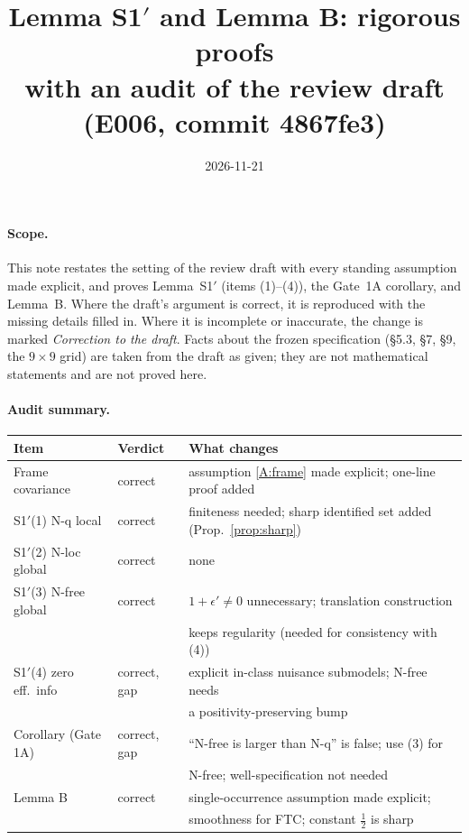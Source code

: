 \documentclass[11pt,a4paper]{article}
\title{Lemma S1$'$ and Lemma B: rigorous proofs\\[2pt]
\large with an audit of the review draft (E006, commit 4867fe3)}
\date{2026-11-21}
\author{}
\theoremstyle{definition}
\theoremstyle{remark}
\newcommand{\eps}{\epsilon}
\begin{document}
\maketitle

\paragraph{Scope.} This note restates the setting of the review draft with every
standing assumption made explicit, and proves Lemma~S1$'$ (items (1)--(4)), the
Gate~1A corollary, and Lemma~B. Where the draft's argument is correct, it is
reproduced with the missing details filled in. Where it is incomplete or
inaccurate, the change is marked \emph{Correction to the draft}. Facts about the
frozen specification (§5.3, §7, §9, the $9\times 9$ grid) are taken from the draft
as given; they are not mathematical statements and are not proved here.

\paragraph{Audit summary.}
\begin{center}
\begin{tabular}{@{}lll@{}}
\toprule
Item & Verdict & What changes \\
\midrule
Frame covariance & correct & assumption \ref{A:frame} made explicit; one-line proof added\\
S1$'$(1) N-q local & correct & finiteness needed; sharp identified set added (Prop.~\ref{prop:sharp})\\
S1$'$(2) N-loc global & correct & none\\
S1$'$(3) N-free global & correct & $1+\eps'\neq 0$ unnecessary; translation construction\\
& & keeps regularity (needed for consistency with (4))\\
S1$'$(4) zero eff.\ info & correct, gap & explicit in-class nuisance submodels; N-free needs\\
& & a positivity-preserving bump\\
Corollary (Gate 1A) & correct, gap & ``N-free is larger than N-q'' is false; use (3) for\\
& & N-free; well-specification not needed\\
Lemma B & correct & single-occurrence assumption made explicit;\\
& & smoothness for FTC; constant $\tfrac12$ is sharp\\
\bottomrule
\end{tabular}
\end{center}
\end{document}
